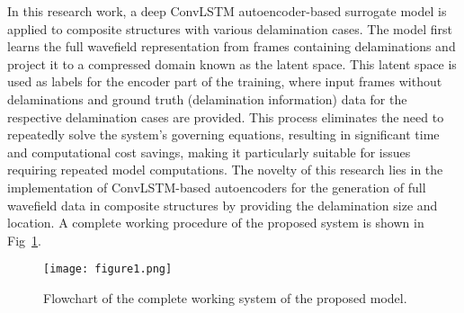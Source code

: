In this research work, a deep ConvLSTM autoencoder-based surrogate model is 
applied to composite structures with various delamination cases. 
The model first learns the full wavefield representation from frames containing delaminations and project it to a compressed domain known as the latent space. 
This latent space is used as labels for the encoder part of the training, where input frames without delaminations and ground truth (delamination information) data for the respective delamination cases are provided.
This process eliminates the need to repeatedly solve the system's governing equations, resulting in significant time and computational cost savings, making it particularly suitable for issues requiring repeated model computations. 
The novelty of this research lies in the implementation of ConvLSTM-based autoencoders for the generation of full wavefield data in composite structures by providing the delamination size and location.
A complete working procedure of the proposed system is shown in Fig~\ref{fig:complete_flowchart}.
\begin{figure} [h!]
	\begin{center}
		\texttt{[image: figure1.png]}
	\end{center}
	\caption{Flowchart of the complete working system of the proposed model.} 
	\label{fig:complete_flowchart}
\end{figure}

